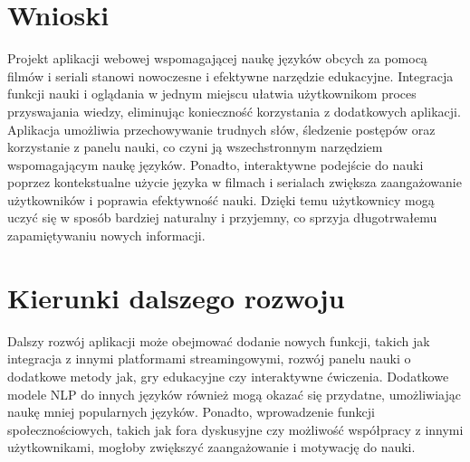 
\section{Wnioski}
Projekt aplikacji webowej wspomagającej naukę języków obcych za pomocą filmów i seriali stanowi nowoczesne i efektywne narzędzie edukacyjne. Integracja funkcji nauki i oglądania w jednym miejscu ułatwia użytkownikom proces przyswajania wiedzy, eliminując konieczność korzystania z dodatkowych aplikacji. Aplikacja umożliwia przechowywanie trudnych słów, śledzenie postępów oraz korzystanie z panelu nauki, co czyni ją wszechstronnym narzędziem wspomagającym naukę języków. Ponadto, interaktywne podejście do nauki poprzez kontekstualne użycie języka w filmach i serialach zwiększa zaangażowanie użytkowników i poprawia efektywność nauki. Dzięki temu użytkownicy mogą uczyć się w sposób bardziej naturalny i przyjemny, co sprzyja długotrwałemu zapamiętywaniu nowych informacji.

\section{Kierunki dalszego rozwoju}
Dalszy rozwój aplikacji może obejmować dodanie nowych funkcji, takich jak integracja z innymi platformami streamingowymi, rozwój panelu nauki o dodatkowe metody jak, gry edukacyjne czy interaktywne ćwiczenia. Dodatkowe modele NLP do innych języków również mogą okazać się przydatne, umożliwiając naukę mniej popularnych języków. Ponadto, wprowadzenie funkcji społecznościowych, takich jak fora dyskusyjne czy możliwość współpracy z innymi użytkownikami, mogłoby zwiększyć zaangażowanie i motywację do nauki.